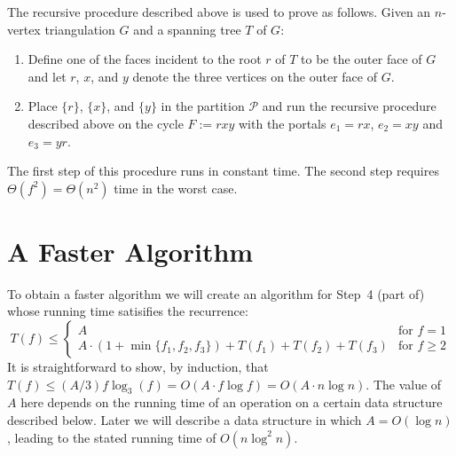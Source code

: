 \documentclass[kpfonts]{patmorin}
\let\le\leqslant
\let\ge\geqslant
\begin{document}
The recursive procedure described above is used to prove  as follows.  Given an $n$-vertex triangulation $G$ and a spanning tree $T$ of $G$:
\begin{enumerate}
  \item Define one of the faces incident to the root $r$ of $T$ to be the outer face of $G$ and let $r$, $x$, and $y$ denote the three vertices on the outer face of $G$.
  \item Place $\{r\}$, $\{x\}$, and $\{y\}$ in the partition $\mathcal{P}$ and run the recursive procedure described above on the cycle $F:=rxy$ with the portals $e_1=rx$, $e_2=xy$ and $e_3=yr$.
\end{enumerate}
The first step of this procedure runs in constant time.  The second step requires $\Theta(f^2)=\Theta(n^2)$ time in the worst case.

\section{A Faster Algorithm}

To obtain a faster algorithm we will create an algorithm for Step~4 (part of) whose running time satisifies the recurrence:
\[  T(f) \le \begin{cases}
         A & \text{for $f=1$} \\
         A\cdot(1+\min\{f_1,f_2,f_3\}) + T(f_1)+T(f_2)+T(f_3) & \text{for $f\ge 2$}
       \end{cases}
\]
It is straightforward to show, by induction, that $T(f)\le (A/3)f\log_3(f)=O(A\cdot f\log f)=O(A\cdot n\log n)$.  The value of $A$ here depends on the running time of an operation on a certain data structure described below.  Later we will describe a data structure in which $A=O(\log n)$, leading to the stated running time of $O(n\log^2 n)$.
\end{document}
